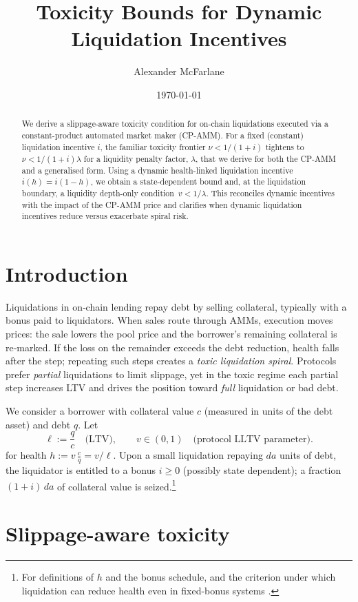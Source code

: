 \documentclass[11pt]{article}
\title{Toxicity Bounds for Dynamic Liquidation Incentives}
\author{Alexander McFarlane}
\date{\today}
\begin{document}
\maketitle

\begin{abstract}
We derive a slippage-aware toxicity condition for on-chain liquidations executed via a constant-product automated market maker (CP-AMM). For a fixed (constant) liquidation incentive \(i\), the familiar toxicity frontier \( \nu < 1/(1+i) \) tightens to
\(\nu < 1/(1+i)\lambda\) for a liquidity penalty factor, \(\lambda\), that we derive for both the CP-AMM and a generalised form. Using a dynamic health-linked liquidation incentive \(i(h) = i(1 - h)\), we obtain a state-dependent bound and, at the liquidation boundary, a liquidity depth-only condition \( \,v < 1/\lambda\). This reconciles dynamic incentives with the impact of the CP-AMM price and clarifies when dynamic liquidation incentives reduce versus exacerbate spiral risk.
\end{abstract}

\section{Introduction}
Liquidations in on‑chain lending repay debt by selling collateral, typically with a bonus paid to liquidators. When sales route through AMMs, execution moves prices: the sale lowers the pool price and the borrower’s remaining collateral is re‑marked. If the loss on the remainder exceeds the debt reduction, health falls after the step; repeating such steps creates a \emph{toxic liquidation spiral}. Protocols prefer \emph{partial} liquidations to limit slippage, yet in the toxic regime each partial step increases LTV and drives the position toward \emph{full} liquidation or bad debt.

We consider a borrower with collateral value \(c\) (measured in units of the debt asset) and debt \(q\). Let
\[
\ell := \frac{q}{c} \quad \text{(LTV)}, 
\qquad v \in (0,1) \quad \text{(protocol LLTV parameter)}.
\]
for health \( h := v\,\frac{c}{q} = v/\ell \). Upon a small liquidation repaying \(da\) units of debt, the liquidator is entitled to a bonus \(i \ge 0\) (possibly state dependent); a fraction \((1+i)\,da\) of collateral value is seized.\footnote{For definitions of \(h\) and the bonus schedule, and the criterion under which liquidation can reduce health even in fixed-bonus systems \cite{Bentley}.}

\section{Slippage-aware toxicity}
\end{document}
